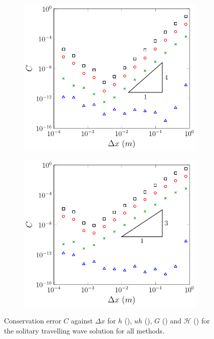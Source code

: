 \begin{figure}
\begin{subfigure}{0.5\textwidth}
		\vspace{0.3cm}
	\end{subfigure}
	\begin{subfigure}{0.5\textwidth}
		\includegraphics[width=\textwidth]{./chp5/figures/Analytic/Soliton/C1/D.pdf}
	\end{subfigure}%
	\begin{subfigure}{0.5\textwidth}
		\includegraphics[width=\textwidth]{./chp5/figures/Analytic/Soliton/C1/W.pdf}
	\end{subfigure}
	\caption{Conservation error $C$ against $\Delta x$ for $h$ (), $uh$ (), $G$ () and $\mathcal{H}$ ({}) for the solitary travelling wave solution for all methods.}
	\label{fig:SolitonC1All}
\end{figure}

